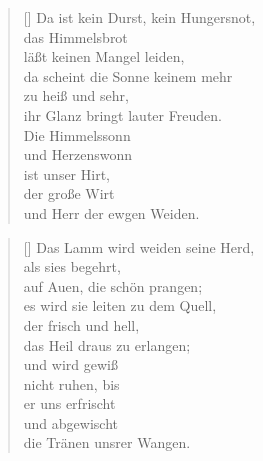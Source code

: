 \begin{multicols}{2}
\begin{verse}[\versewidth]
 Da ist kein Durst, kein Hungersnot,\\
das Himmelsbrot\\
läßt keinen Mangel leiden,\\
da scheint die Sonne keinem mehr\\
zu heiß und sehr,\\
ihr Glanz bringt lauter Freuden.\\
Die Himmelssonn\\
und Herzenswonn\\
ist unser Hirt,\\
der große Wirt\\
und Herr der ewgen Weiden.
\end{verse}
\end{multicols}

\begin{center}
\settowidth{\versewidth}{Der, vor dem die Welt erschrickt,}
\begin{verse}[\versewidth]
 Das Lamm wird weiden seine Herd,\\
als sies begehrt,\\
auf Auen, die schön prangen;\\
es wird sie leiten zu dem Quell,\\
der frisch und hell,\\
das Heil draus zu erlangen;\\
und wird gewiß\\
nicht ruhen, bis\\
er uns erfrischt\\
und abgewischt\\
die Tränen unsrer Wangen.
 
\end{verse}
\end{center}



